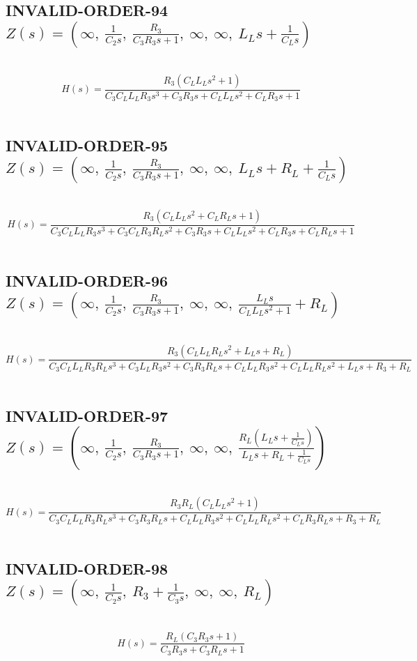 \documentclass{article}
\begin{document}
\subsection{INVALID-ORDER-94 $Z(s) = \left( \infty, \  \frac{1}{C_{2} s}, \  \frac{R_{3}}{C_{3} R_{3} s + 1}, \  \infty, \  \infty, \  L_{L} s + \frac{1}{C_{L} s}\right)$ } \ 
\textbf{\[H(s) = \frac{R_{3} \left(C_{L} L_{L} s^{2} + 1\right)}{C_{3} C_{L} L_{L} R_{3} s^{3} + C_{3} R_{3} s + C_{L} L_{L} s^{2} + C_{L} R_{3} s + 1}\] } \ 
\subsection{INVALID-ORDER-95 $Z(s) = \left( \infty, \  \frac{1}{C_{2} s}, \  \frac{R_{3}}{C_{3} R_{3} s + 1}, \  \infty, \  \infty, \  L_{L} s + R_{L} + \frac{1}{C_{L} s}\right)$ } \ 
\textbf{\[H(s) = \frac{R_{3} \left(C_{L} L_{L} s^{2} + C_{L} R_{L} s + 1\right)}{C_{3} C_{L} L_{L} R_{3} s^{3} + C_{3} C_{L} R_{3} R_{L} s^{2} + C_{3} R_{3} s + C_{L} L_{L} s^{2} + C_{L} R_{3} s + C_{L} R_{L} s + 1}\] } \ 
\subsection{INVALID-ORDER-96 $Z(s) = \left( \infty, \  \frac{1}{C_{2} s}, \  \frac{R_{3}}{C_{3} R_{3} s + 1}, \  \infty, \  \infty, \  \frac{L_{L} s}{C_{L} L_{L} s^{2} + 1} + R_{L}\right)$ } \ 
\textbf{\[H(s) = \frac{R_{3} \left(C_{L} L_{L} R_{L} s^{2} + L_{L} s + R_{L}\right)}{C_{3} C_{L} L_{L} R_{3} R_{L} s^{3} + C_{3} L_{L} R_{3} s^{2} + C_{3} R_{3} R_{L} s + C_{L} L_{L} R_{3} s^{2} + C_{L} L_{L} R_{L} s^{2} + L_{L} s + R_{3} + R_{L}}\] } \ 
\subsection{INVALID-ORDER-97 $Z(s) = \left( \infty, \  \frac{1}{C_{2} s}, \  \frac{R_{3}}{C_{3} R_{3} s + 1}, \  \infty, \  \infty, \  \frac{R_{L} \left(L_{L} s + \frac{1}{C_{L} s}\right)}{L_{L} s + R_{L} + \frac{1}{C_{L} s}}\right)$ } \ 
\textbf{\[H(s) = \frac{R_{3} R_{L} \left(C_{L} L_{L} s^{2} + 1\right)}{C_{3} C_{L} L_{L} R_{3} R_{L} s^{3} + C_{3} R_{3} R_{L} s + C_{L} L_{L} R_{3} s^{2} + C_{L} L_{L} R_{L} s^{2} + C_{L} R_{3} R_{L} s + R_{3} + R_{L}}\] } \ 
\subsection{INVALID-ORDER-98 $Z(s) = \left( \infty, \  \frac{1}{C_{2} s}, \  R_{3} + \frac{1}{C_{3} s}, \  \infty, \  \infty, \  R_{L}\right)$ } \ 
\textbf{\[H(s) = \frac{R_{L} \left(C_{3} R_{3} s + 1\right)}{C_{3} R_{3} s + C_{3} R_{L} s + 1}\] } \ 
\end{document}
